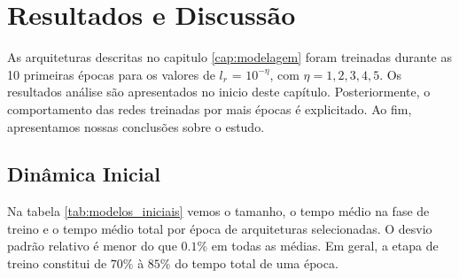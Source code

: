 \chapter{Resultados e Discussão} \label{cap:resultados}

As arquiteturas descritas no capitulo \ref{cap:modelagem} foram treinadas durante as 10 primeiras épocas para os valores de $l_r$ = $10^{-\eta}$, com $\eta=1,2,3,4,5$. Os resultados análise são apresentados no inicio deste capítulo. Posteriormente, o comportamento das redes treinadas por mais épocas é explicitado. Ao fim, apresentamos nossas conclusões sobre o estudo.

\section{Dinâmica Inicial}

Na tabela \ref{tab:modelos_iniciais} vemos o tamanho, o tempo médio na fase de treino e o tempo médio total por época de arquiteturas selecionadas. O desvio padrão relativo é menor do que $0.1\%$ em todas as médias. Em geral, a etapa de treino constitui de $70\%$ à $85\%$ do tempo total de uma época.

